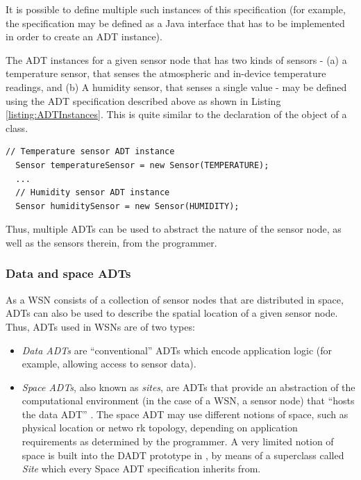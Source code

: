 It is possible to define multiple such instances of this specification (for
example, the specification may be defined as a Java interface that has to
be implemented in order to create an ADT instance).

The ADT instances for a given sensor node that has two kinds of
sensors - (a) a temperature sensor, that senses the atmospheric and in-device
  temperature readings, and (b) A humidity sensor, that senses a single value -
  may be defined using the ADT specification described above as shown in
  Listing \ref{listing:ADTInstances}. This is quite similar to the declaration
  of the object of a class.  

\begin{lstlisting}[frame=trbl, basewidth={0.55em, 0.6em}, captionpos=b,
basicstyle=\ttfamily\footnotesize, breaklines, caption = Sensor ADT instances, label =
listing:ADTInstance ]
  // Temperature sensor ADT instance
  Sensor temperatureSensor = new Sensor(TEMPERATURE);
  ...
  // Humidity sensor ADT instance  
  Sensor humiditySensor = new Sensor(HUMIDITY);
\end{lstlisting}

Thus, multiple ADTs can be used to abstract the nature of the
sensor node, as well as the sensors therein, from the programmer. 

\subsubsection{Data and space ADTs} \label{subsubsec:DataAndSpaceADTs}

As a WSN consists of a collection of sensor nodes that are distributed in
space, ADTs can also be used to describe the spatial location of a given
sensor node. Thus, ADTs used in WSNs are of two types:

\begin{itemize}
  \item \emph{Data ADTs} are ``conventional'' ADTs which encode
  application logic (for example, allowing access to sensor data).
  \item \emph{Space ADTs}, also known as \emph{sites}, are ADTs that provide an
  abstraction of the computational environment (in the case of a WSN, a sensor
  node) that ``hosts the data ADT'' \cite{migliavacca_DADT:2006}. The space ADT
  may use different notions of space, such as physical location or netwo
 rk topology, depending on application requirements as determined by the
 programmer. A very limited notion of space is built into the DADT prototype in
 \cite{migliavacca_DADT:2006}, by means of a superclass called \emph{Site} which
 every Space ADT specification inherits from.
\end{itemize}

